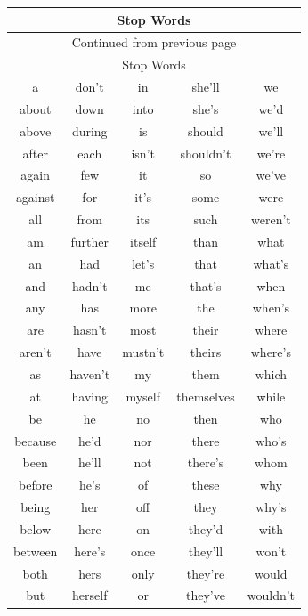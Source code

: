 \documentclass[12pt]{article}
\begin{document}
\begin{longtable}{|c|c|c|c|c|}
    \hline
    \multicolumn{5}{|c|}{Stop Words} \\
    \hline
    \endfirsthead
    \multicolumn{5}{c}{Continued from previous page}\\
    \hline
    \multicolumn{5}{|c|}{Stop Words} \\
    \hline
    \endhead
    a & don't & in & she'll & we\\
    \hline
    about & down & into & she's & we'd\\
    \hline
    above & during & is & should & we'll\\
    \hline
    after & each & isn't & shouldn't & we're\\
    \hline
    again & few & it & so & we've\\
    \hline
    against & for & it's & some & were\\
    \hline
    all & from & its & such & weren't\\
    \hline
    am & further & itself & than & what\\
    \hline
    an & had & let's & that & what's\\
    \hline
    and & hadn't & me & that's & when\\
    \hline
    any & has & more & the & when's\\
    \hline
    are & hasn't & most & their & where\\
    \hline
    aren't & have & mustn't & theirs & where's\\
    \hline
    as & haven't & my & them & which\\
    \hline
    at & having & myself & themselves & while\\
    \hline
    be & he & no & then & who\\
    \hline
    because & he'd & nor & there & who's\\
    \hline
    been & he'll & not & there's & whom\\
    \hline
    before & he's & of & these & why\\
    \hline
    being & her & off & they & why's\\
    \hline
    below & here & on & they'd & with\\
    \hline
    between & here's & once & they'll & won't\\
    \hline
    both & hers & only & they're & would\\
    \hline
    but & herself & or & they've & wouldn't\\

\end{longtable}
\end{document}
